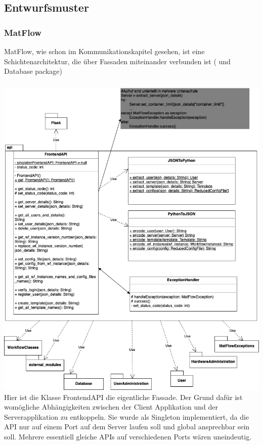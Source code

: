 \subsection{Entwurfsmuster}

\subsubsection{MatFlow}
MatFlow, wie schon im Kommunikationskapitel gesehen, ist eine Schichtenarchitektur, die über Fassaden miteinander verbunden ist
( und Database package)

\subsubsection{}
\includegraphics[width=1\textwidth]{res/api.drawio.png}
Hier ist die Klasse FrontendAPI die eigentliche Fassade. Der Grund dafür ist womögliche Abhängigkeiten zwischen
der Client Applikation und der Serverapplikation zu entkoppeln. Sie wurde als Singleton implementiert, da die API
nur auf einem Port auf dem Server laufen soll und global ansprechbar sein soll. Mehrere essentiell gleiche APIs auf
verschiedenen Ports wären uneindeutig.


\newpage